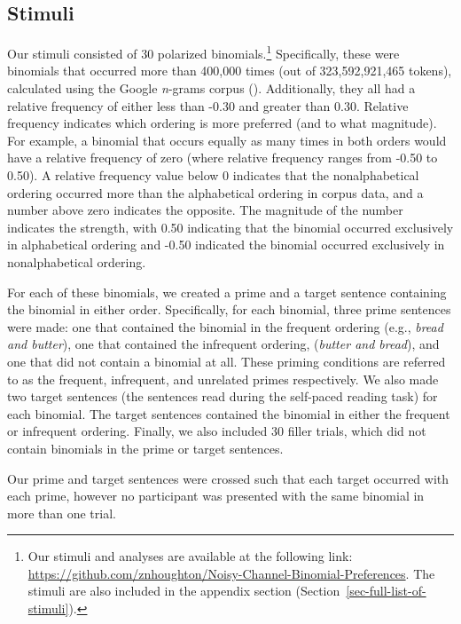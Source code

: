 \documentclass[
  12pt,
]{scrartcl}
\begin{document}
\subsection{Stimuli}\label{stimuli}

Our stimuli consisted of 30 polarized binomials.\footnote{Our stimuli
  and analyses are available at the following link:
  \url{https://github.com/znhoughton/Noisy-Channel-Binomial-Preferences}.
  The stimuli are also included in the appendix section
  (Section~\ref{sec-full-list-of-stimuli}).} Specifically, these were
binomials that occurred more than 400,000 times (out of 323,592,921,465
tokens), calculated using the Google \emph{n}-grams corpus
(). Additionally, they all had a relative frequency of either less
than -0.30 and greater than 0.30. Relative frequency indicates which
ordering is more preferred (and to what magnitude). For example, a
binomial that occurs equally as many times in both orders would have a
relative frequency of zero (where relative frequency ranges from -0.50
to 0.50). A relative frequency value below 0 indicates that the
nonalphabetical ordering occurred more than the alphabetical ordering in
corpus data, and a number above zero indicates the opposite. The
magnitude of the number indicates the strength, with 0.50 indicating
that the binomial occurred exclusively in alphabetical ordering and
-0.50 indicated the binomial occurred exclusively in nonalphabetical
ordering.

For each of these binomials, we created a prime and a target sentence
containing the binomial in either order. Specifically, for each
binomial, three prime sentences were made: one that contained the
binomial in the frequent ordering (e.g., \emph{bread and butter}), one
that contained the infrequent ordering, (\emph{butter and bread}), and
one that did not contain a binomial at all. These priming conditions are
referred to as the frequent, infrequent, and unrelated primes
respectively. We also made two target sentences (the sentences read
during the self-paced reading task) for each binomial. The target
sentences contained the binomial in either the frequent or infrequent
ordering. Finally, we also included 30 filler trials, which did not
contain binomials in the prime or target sentences.

Our prime and target sentences were crossed such that each target
occurred with each prime, however no participant was presented with the
same binomial in more than one trial.
\end{document}
